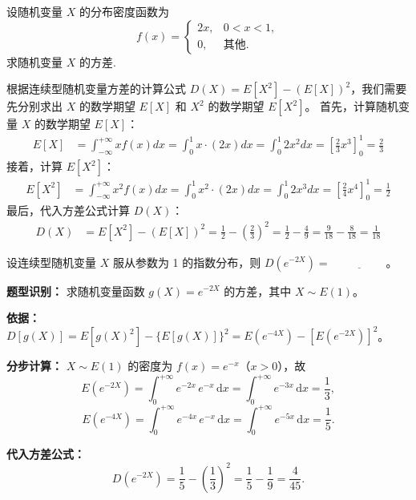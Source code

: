﻿\documentclass[lang=cn,11pt]{elegantbook}
\begin{document}
\begin{exercise}
设随机变量 $X$ 的分布密度函数为
$$f(x) = \begin{cases} 2x, & 0 < x < 1, \\ 0, & \text{其他.} \end{cases}$$
求随机变量 $X$ 的方差.
\end{exercise}

\begin{solution}
根据连续型随机变量方差的计算公式 $D(X) = E[X^2] - (E[X])^2$，我们需要先分别求出 $X$ 的数学期望 $E[X]$ 和 $X^2$ 的数学期望 $E[X^2]$。
首先，计算随机变量 $X$ 的数学期望 $E[X]$：
\begin{align*}
E[X] &= \int_{-\infty}^{+\infty} x f(x) dx = \int_{0}^{1} x \cdot (2x) dx = \int_{0}^{1} 2x^2 dx = \left[ \frac{2}{3}x^3 \right]_0^1 = \frac{2}{3}
\end{align*}
接着，计算 $E[X^2]$：
\begin{align*}
E[X^2] &= \int_{-\infty}^{+\infty} x^2 f(x) dx = \int_{0}^{1} x^2 \cdot (2x) dx = \int_{0}^{1} 2x^3 dx = \left[ \frac{2}{4}x^4 \right]_0^1 = \frac{1}{2}
\end{align*}
最后，代入方差公式计算 $D(X)$：
\begin{align*}
D(X) &= E[X^2] - (E[X])^2 = \frac{1}{2} - \left(\frac{2}{3}\right)^2 = \frac{1}{2} - \frac{4}{9} = \frac{9}{18} - \frac{8}{18} = \frac{1}{18}
\end{align*}
\end{solution}

\begin{exercise}\label{exer:4-s6-dexp}
设连续型随机变量 \(X\) 服从参数为 1 的指数分布，则 \(D(e^{-2X}) =\,\underline{\hspace{2cm}}\)。
\end{exercise}
\begin{solution}
\textbf{题型识别：} 求随机变量函数 $g(X) = e^{-2X}$ 的方差，其中 $X \sim E(1)$。

\textbf{依据：} $D[g(X)] = E[g(X)^2] - \{E[g(X)]\}^2 = E(e^{-4X}) - [E(e^{-2X})]^2$。

\textbf{分步计算：} $X \sim E(1)$ 的密度为 $f(x) = e^{-x}$（$x > 0$），故
\[
E(e^{-2X}) = \int_0^{+\infty} e^{-2x}\,e^{-x}\,\mathrm{d}x = \int_0^{+\infty} e^{-3x}\,\mathrm{d}x = \frac{1}{3},
\]
\[
E(e^{-4X}) = \int_0^{+\infty} e^{-4x}\,e^{-x}\,\mathrm{d}x = \int_0^{+\infty} e^{-5x}\,\mathrm{d}x = \frac{1}{5}.
\]

\textbf{代入方差公式：}
\[
D(e^{-2X}) = \frac{1}{5} - \left(\frac{1}{3}\right)^2 = \frac{1}{5} - \frac{1}{9} = \frac{4}{45}.
\]
\end{solution}
\end{document}
